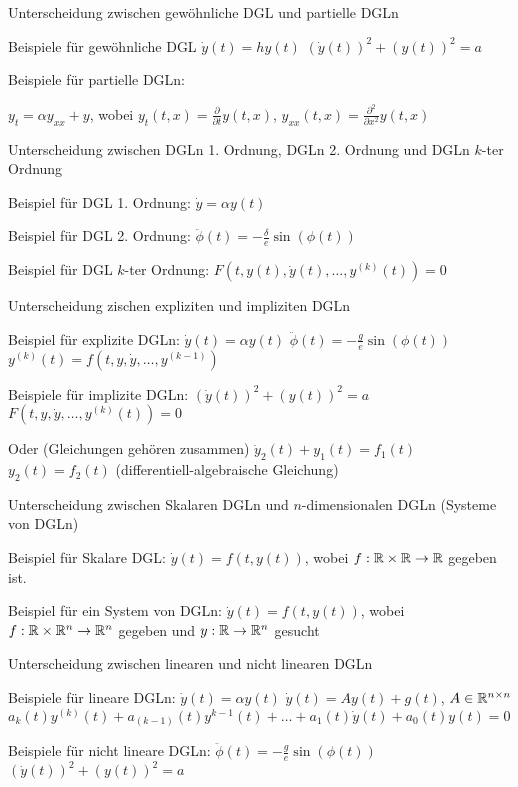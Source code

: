 \documentclass{cheat-sheet}
\begin{document}
\iffalse

Unterscheidung zwischen gewöhnliche DGL und partielle DGLn

Beispiele für gewöhnliche DGL
$\dot{y}(t) = h y(t)$
$(\dot{y}(t))^2 + (y(t))^2 = a$

Beispiele für partielle DGLn:

$y_t = \alpha y_{xx} + y$, wobei $y_t(t,x) = \tfrac{\partial}{\partial t} y(t, x)$, $y_{xx}(t, x) = \tfrac{\partial^2}{\partial x^2} y(t, x)$


Unterscheidung zwischen DGLn 1. Ordnung, DGLn 2. Ordnung und DGLn $k$-ter Ordnung

Beispiel für DGL 1. Ordnung:
$\dot{y} = \alpha y(t)$

Beispiel für DGL 2. Ordnung:
$\ddot{\phi}(t) = - \tfrac{\delta}{e} \sin(\phi(t))$

Beispiel für DGL $k$-ter Ordnung:
$F(t, y(t), \dot{y}(t), \ldots, y^{(k)}(t)) = 0$


Unterscheidung zischen expliziten und impliziten DGLn

Beispiel für explizite DGLn:
$\dot{y}(t) = \alpha y(t)$
$\ddot{\phi}(t) = - \tfrac{g}{e} \sin(\phi(t))$
$y^{(k)}(t) = f(t, y, \dot{y}, \ldots, y^{(k-1)})$

Beispiele für implizite DGLn:
$(\dot{y}(t))^2 + (y(t))^2 = a$
$F(t, y, \dot{y}, \ldots, y^{(k)}(t)) = 0$

Oder (Gleichungen gehören zusammen)
$\dot{y}_2(t) + y_1(t) = f_1(t)$
$y_2(t) = f_2(t)$
(differentiell-algebraische Gleichung)

Unterscheidung zwischen Skalaren DGLn und $n$-dimensionalen DGLn (Systeme von DGLn)

Beispiel für Skalare DGL:
$\dot{y}(t) = f(t, y(t))$, wobei $f : \mathbb{R} \times \mathbb{R} \to \mathbb{R}$ gegeben ist.

Beispiel für ein System von DGLn:
$\dot{y}(t) = f(t, y(t))$, wobei $f : \mathbb{R} \times \mathbb{R}^n \to \mathbb{R}^n$ gegeben und $y : \mathbb{R} \to \mathbb{R}^n$ gesucht

Unterscheidung zwischen linearen und nicht linearen DGLn

Beispiele für lineare DGLn:
$\dot{y}(t) = \alpha y(t)$
$\dot{y}(t) = A y(t) + g(t)$, $A \in \mathbb{R}^{n \times n}$
$a_k(t) y^{(k)}(t) + a_{(k-1)}(t) y^{k-1}(t) + \ldots + a_1(t) \dot{y}(t) + a_0(t)y(t) = 0$

Beispiele für nicht lineare DGLn:
$\ddot{\phi}(t) = - \tfrac{g}{e} \sin(\phi(t))$
$(\dot{y}(t))^2 + (y(t))^2 = a$
\end{document}
